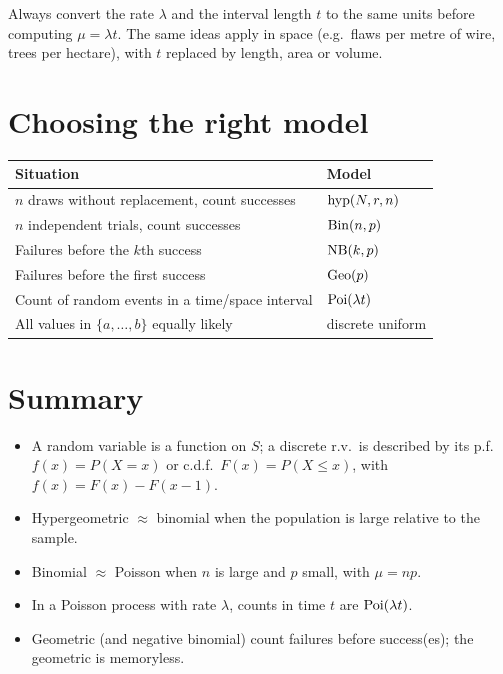\begin{important}
Always convert the rate $\lambda$ and the interval length $t$ to the same units before
computing $\mu = \lambda t$. The same ideas apply in space (e.g.\ flaws per metre of
wire, trees per hectare), with $t$ replaced by length, area or volume.
\end{important}

\section{Choosing the right model}

\begin{center}
\begin{tabular}{ll}
\toprule
Situation & Model \\
\midrule
$n$ draws without replacement, count successes & $\operatorname{hyp}(N,r,n)$ \\
$n$ independent trials, count successes & $\operatorname{Bin}(n,p)$ \\
Failures before the $k$th success & $\operatorname{NB}(k,p)$ \\
Failures before the first success & $\operatorname{Geo}(p)$ \\
Count of random events in a time/space interval & $\operatorname{Poi}(\lambda t)$ \\
All values in $\{a,\dots,b\}$ equally likely & discrete uniform \\
\bottomrule
\end{tabular}
\end{center}

\section{Summary}

\begin{itemize}
  \item A random variable is a function on $S$; a discrete r.v.\ is described by its p.f.\
        $f(x) = P(X=x)$ or c.d.f.\ $F(x) = P(X\le x)$, with $f(x) = F(x) - F(x-1)$.
  \item Hypergeometric $\approx$ binomial when the population is large relative to the
        sample.
  \item Binomial $\approx$ Poisson when $n$ is large and $p$ small, with $\mu = np$.
  \item In a Poisson process with rate $\lambda$, counts in time $t$ are $\operatorname{Poi}(\lambda t)$.
  \item Geometric (and negative binomial) count failures before success(es); the geometric
        is memoryless.
\end{itemize}
